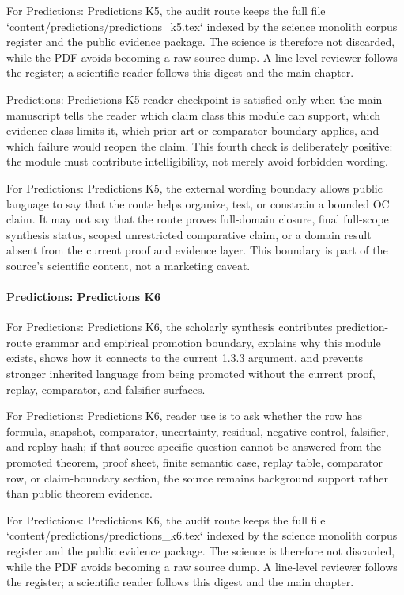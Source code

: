 For Predictions: Predictions K5, the audit route keeps the full file `content/predictions/predictions\_k5.tex` indexed by the science monolith corpus register and the public evidence package. The science is therefore not discarded, while the PDF avoids becoming a raw source dump. A line-level reviewer follows the register; a scientific reader follows this digest and the main chapter.


Predictions: Predictions K5 reader checkpoint is satisfied only when the main manuscript tells the reader which claim class this module can support, which evidence class limits it, which prior-art or comparator boundary applies, and which failure would reopen the claim. This fourth check is deliberately positive: the module must contribute intelligibility, not merely avoid forbidden wording.


For Predictions: Predictions K5, the external wording boundary allows public language to say that the route helps organize, test, or constrain a bounded OC claim. It may not say that the route proves full-domain closure, final full-scope synthesis status, scoped unrestricted comparative claim, or a domain result absent from the current proof and evidence layer. This boundary is part of the source's scientific content, not a marketing caveat.


\paragraph{Predictions: Predictions K6}

For Predictions: Predictions K6, the scholarly synthesis contributes prediction-route grammar and empirical promotion boundary, explains why this module exists, shows how it connects to the current 1.3.3 argument, and prevents stronger inherited language from being promoted without the current proof, replay, comparator, and falsifier surfaces.


For Predictions: Predictions K6, reader use is to ask whether the row has formula, snapshot, comparator, uncertainty, residual, negative control, falsifier, and replay hash; if that source-specific question cannot be answered from the promoted theorem, proof sheet, finite semantic case, replay table, comparator row, or claim-boundary section, the source remains background support rather than public theorem evidence.


For Predictions: Predictions K6, the audit route keeps the full file `content/predictions/predictions\_k6.tex` indexed by the science monolith corpus register and the public evidence package. The science is therefore not discarded, while the PDF avoids becoming a raw source dump. A line-level reviewer follows the register; a scientific reader follows this digest and the main chapter.


